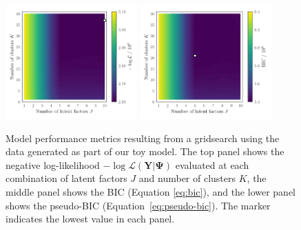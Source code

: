 \documentclass[twocolumn]{aastex61}
\newcommand{\vect}[1]{\boldsymbol{\mathbf{#1}}}
\renewcommand{\vec}[1]{\vect{#1}}
\newcommand{\data}{\textbf{Y}}
\newcommand{\transpose}{^\intercal}
\newcommand{\eye}{\textbf{I}}
\newcommand{\NumLatentFactors}{J}
\newcommand{\NumComponents}{K}
\begin{document}
\begin{figure}
	\includegraphics[width=0.45\textwidth]{experiments/exp1-gridsearch-ll-contours.png}
	\includegraphics[width=0.45\textwidth]{experiments/exp1-gridsearch-bic-contours.png}
    \caption{Model performance metrics resulting from a gridsearch using the
    		 data generated as part of our toy model. The top 
		 	 panel shows the negative log-likelihood 
			 $-\log{\mathcal{L}\left(\data|\vec\Psi\right)}$ 
			 evaluated at each combination of latent factors $J$ and number 
			 of clusters $K$, the middle panel shows the BIC (Equation \ref{eq:bic}), 
			 and the lower panel shows
			 the pseudo-BIC
			 (Equation~\ref{eq:pseudo-bic}). The marker indicates the 
			 lowest value in each panel.}
    \label{fig:experiment-1-gridsearch}
\end{figure}




\end{document}
